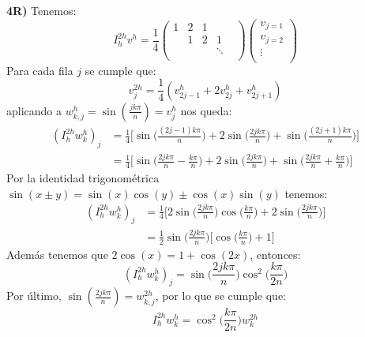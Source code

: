 \documentclass{article}
\begin{document}
\begin{enumerate}
    \textbf{4R)} Tenemos:
    $$ I^{2h}_h v^h = \frac{1}{4} 
        \left( \begin{array}{ccccc}
            1 & 2 & 1 &   &   \\
              & 1 & 2 & 1 &   \\
              &   &   & \ddots &  \\
        \end{array} \right)
        \left( \begin{array}{c}
            v_{j=1} \\
            v_{j=2} \\
            \vdots \\
        \end{array} \right)$$
    Para cada fila $j$ se cumple que: 
        $$v^{2h}_j = \frac{1}{4} (v^h_{2j-1} + 2v^h_{2j} + v^h_{2j+1})$$
    aplicando a $w^h_{k,j} = \sin{(\frac{jk\pi}{n})} = v^h_j$ nos queda:
    \begin{align*}
        (I^{2h}_hw^h_k)_j &= \frac{1}{4} \Bigg[
                \sin{\bigg(\frac{(2j-1)k\pi}{n}\bigg)} +
                2\sin{\bigg(\frac{2jk\pi}{n}\bigg)} +
                \sin{\bigg(\frac{(2j+1)k\pi}{n}\bigg)}
            \Bigg] \\
            &= \frac{1}{4} \Bigg[
                \sin{\bigg(\frac{2jk\pi}{n} - \frac{k\pi}{n} \bigg)} +
                2\sin{\bigg(\frac{2jk\pi}{n}\bigg)} +
                \sin{\bigg(\frac{2jk\pi}{n} + \frac{k\pi}{n} \bigg)} \Bigg]
    \end{align*}
    Por la identidad trigonométrica 
    $\sin{(x\pm y)} = \sin{(x)}\cos{(y)}\pm \cos{(x)}\sin{(y)}$ tenemos:
    \begin{align*}
        (I^{2h}_hw^h_k)_j &= \frac{1}{4} \Bigg[
                2\sin{\bigg(\frac{2jk\pi}{n}\bigg)}\cos{\bigg(\frac{k\pi}{n}\bigg)}
                +2 \sin{\bigg(\frac{2jk\pi}{n}\bigg)}
            \Bigg] \\
            &= \frac{1}{2} \sin{\bigg(\frac{2jk\pi}{n}\bigg)}
            \Bigg[
                \cos{\bigg(\frac{k\pi}{n}\bigg)} + 1
            \Bigg]
    \end{align*}    
    Además tenemos que $2\cos{(x)} = 1+\cos{(2x)}$, entonces:
    $$
        (I^{2h}_hw^h_k)_j =
            \sin{\bigg(\frac{2jk\pi}{n}\bigg)}
            \cos^2{\bigg(\frac{k\pi}{2n}\bigg)}
    $$
    Por último, $\sin{(\frac{2jk\pi}{n})} = w^{2h}_{k,j}$, por lo que se cumple que:
    $$
        I^{2h}_hw^h_k = \cos^2{\bigg(\frac{k\pi}{2n}\bigg)} w^{2h}_k
    $$
\end{enumerate}
\end{document}
